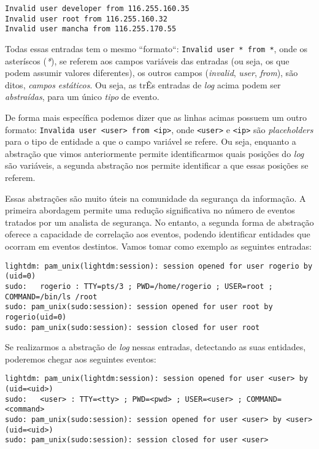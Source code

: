 \documentclass[
	12pt,				%
	openright,			%
	twoside,			%
	a4paper,			%
	english,			%
	spanish,			%
	brazil,				%
	]{abntex2}
\begin{document}
\begin{verbatim}
Invalid user developer from 116.255.160.35
Invalid user root from 116.255.160.32
Invalid user mancha from 116.255.170.55
\end{verbatim}
	
Todas essas entradas tem o mesmo ``formato``: \verb|Invalid user * from *|, onde os asteríscos (\emph{*}), se referem aos campos variáveis das entradas (ou seja, os que podem assumir valores diferentes), os outros campos (\emph{invalid}, \emph{user}, \emph{from}), são ditos, \emph{campos estáticos}. Ou seja, as trÊs entradas de \emph{log} acima podem ser \emph{abstraídas}, para um único \emph{tipo} de evento. 

De forma mais específica podemos dizer que as linhas acimas possuem um outro formato: \verb|Invalida user <user> from <ip>|, onde \verb|<user>| e \verb|<ip>| são \emph{placeholders} para o tipo de entidade a que o campo variável se refere. Ou seja, enquanto a abstração que vimos anteriormente permite identificarmos quais posições do \emph{log} são variáveis, a segunda abstração nos permite identificar a que essas posições se referem.

Essas abstrações são muito úteis na comunidade da segurança da informação. A primeira abordagem permite uma redução significativa no número de eventos tratados por um analista de segurança. No entanto, a segunda forma de abstração oferece a capacidade de correlação aos eventos, podendo identificar entidades que ocorram em eventos destintos. Vamos tomar como exemplo as seguintes entradas:

{\small
\begin{verbatim}
lightdm: pam_unix(lightdm:session): session opened for user rogerio by (uid=0)
sudo:   rogerio : TTY=pts/3 ; PWD=/home/rogerio ; USER=root ; COMMAND=/bin/ls /root
sudo: pam_unix(sudo:session): session opened for user root by rogerio(uid=0)
sudo: pam_unix(sudo:session): session closed for user root
\end{verbatim}
}

Se realizarmos a abstração de \emph{log} nessas entradas, detectando as suas entidades, poderemos chegar aos seguintes eventos:

{\small
\begin{verbatim}
lightdm: pam_unix(lightdm:session): session opened for user <user> by (uid=<uid>)
sudo:   <user> : TTY=<tty> ; PWD=<pwd> ; USER=<user> ; COMMAND=<command>
sudo: pam_unix(sudo:session): session opened for user <user> by <user>(uid=<uid>)
sudo: pam_unix(sudo:session): session closed for user <user>
\end{verbatim}
}
\end{document}
